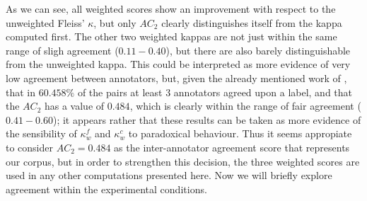 As we can see, all weighted scores show an improvement with respect to the unweighted Fleiss' $\kappa$, but only $AC_2$ clearly distinguishes itself from the kappa computed first. The other two weighted kappas are not just within the same range of sligh agreement ($0.11-0.40$), but there are also barely distinguishable from the unweighted kappa. This could be interpreted as more evidence of very low agreement between annotators, but, given the already mentioned work of \citet{vanacore2022robustness}, that in $60.458\%$ of the pairs at least 3 annotators agreed upon a label, and that the $AC_2$ has a value of $0.484$, which is clearly within the range of fair agreement ($0.41-0.60$); it appears rather that these results can be taken as more evidence of the sensibility of $\kappa^{f}_{w}$ and $\kappa^{c}_{w}$ to paradoxical behaviour. Thus it seems appropiate to consider $AC_2=0.484$ as the inter-annotator agreement score that represents our corpus, but in order to strengthen this decision, the three weighted scores are used in any other computations presented here. Now we will briefly explore agreement within the experimental conditions.\\

